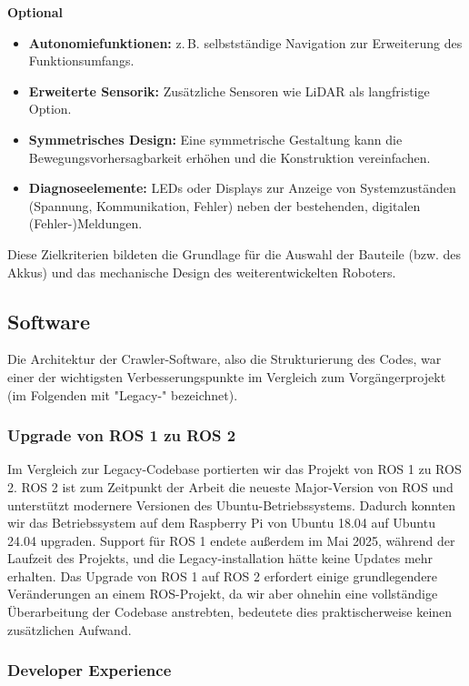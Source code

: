 \textbf{Optional}
\begin{itemize}
  \item \textbf{Autonomiefunktionen:} z.\,B. selbstständige Navigation zur Erweiterung des Funktionsumfangs.
  \item \textbf{Erweiterte Sensorik:} Zusätzliche Sensoren wie LiDAR als langfristige Option.
  \item \textbf{Symmetrisches Design:} Eine symmetrische Gestaltung kann die Bewegungsvorhersagbarkeit erhöhen und die Konstruktion vereinfachen.
  \item \textbf{Diagnoseelemente:} LEDs oder Displays zur Anzeige von Systemzuständen (Spannung, Kommunikation, Fehler) neben der bestehenden, digitalen (Fehler-)Meldungen.
\end{itemize}

Diese Zielkriterien bildeten die Grundlage für die Auswahl der Bauteile (bzw. des Akkus) und das mechanische Design des weiterentwickelten Roboters.

\subsection{Software}

Die Architektur der Crawler-Software, also die Strukturierung des Codes, war einer der wichtigsten Verbesserungspunkte im Vergleich zum Vorgängerprojekt (im Folgenden mit "Legacy-" bezeichnet). 

\subsubsection{Upgrade von ROS 1 zu ROS 2}

Im Vergleich zur Legacy-Codebase portierten wir das Projekt von ROS 1 zu ROS 2. ROS 2 ist zum Zeitpunkt der Arbeit die neueste Major-Version von ROS und unterstützt modernere Versionen des Ubuntu-Betriebssystems. Dadurch konnten wir das Betriebssystem auf dem Raspberry Pi von Ubuntu 18.04 auf Ubuntu 24.04 upgraden. Support für ROS 1 endete außerdem im Mai 2025, während der Laufzeit des Projekts, und die Legacy-installation hätte keine Updates mehr erhalten. Das Upgrade von ROS 1 auf ROS 2 erfordert einige grundlegendere Veränderungen an einem ROS-Projekt, da wir aber ohnehin eine vollständige Überarbeitung der Codebase anstrebten, bedeutete dies praktischerweise keinen zusätzlichen Aufwand. 

\subsubsection{Developer Experience}


